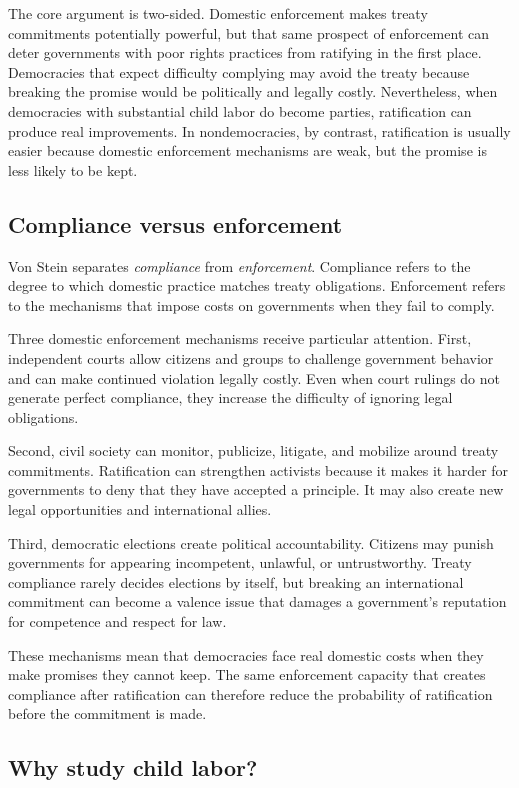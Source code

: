 The core argument is two-sided. Domestic enforcement makes treaty commitments potentially powerful, but that same prospect of enforcement can deter governments with poor rights practices from ratifying in the first place. Democracies that expect difficulty complying may avoid the treaty because breaking the promise would be politically and legally costly. Nevertheless, when democracies with substantial child labor do become parties, ratification can produce real improvements. In nondemocracies, by contrast, ratification is usually easier because domestic enforcement mechanisms are weak, but the promise is less likely to be kept.

\subsection{Compliance versus enforcement}

Von Stein separates \textit{compliance} from \textit{enforcement}. Compliance refers to the degree to which domestic practice matches treaty obligations. Enforcement refers to the mechanisms that impose costs on governments when they fail to comply.

Three domestic enforcement mechanisms receive particular attention. First, independent courts allow citizens and groups to challenge government behavior and can make continued violation legally costly. Even when court rulings do not generate perfect compliance, they increase the difficulty of ignoring legal obligations.

Second, civil society can monitor, publicize, litigate, and mobilize around treaty commitments. Ratification can strengthen activists because it makes it harder for governments to deny that they have accepted a principle. It may also create new legal opportunities and international allies.

Third, democratic elections create political accountability. Citizens may punish governments for appearing incompetent, unlawful, or untrustworthy. Treaty compliance rarely decides elections by itself, but breaking an international commitment can become a valence issue that damages a government's reputation for competence and respect for law.

These mechanisms mean that democracies face real domestic costs when they make promises they cannot keep. The same enforcement capacity that creates compliance after ratification can therefore reduce the probability of ratification before the commitment is made.

\subsection{Why study child labor?}


